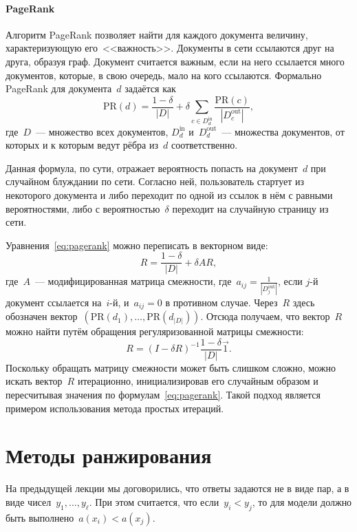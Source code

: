 \documentclass[12pt,fleqn]{article}
\begin{document}
\paragraph{PageRank}
Алгоритм PageRank позволяет найти для каждого документа величину,
характеризующую его~<<важность>>.
Документы в сети ссылаются друг на друга, образуя граф.
Документ считается важным, если на него ссылается много документов,
которые, в свою очередь, мало на кого ссылаются.
Формально PageRank для документа~$d$ задаётся как
\begin{equation}
\label{eq:pagerank}
    \text{PR}(d)
    =
    \frac{1 - \delta}{|D|}
    +
    \delta
    \sum_{c \in D_d^\text{in}}
        \frac{
            \text{PR}(c)
        }{
            |D_c^\text{out}|
        },
\end{equation}
где~$D$~--- множество всех документов,
$D_d^\text{in}$ и~$D_d^\text{out}$~--- множества документов, от которых и к которым ведут рёбра из~$d$ соответственно.

Данная формула, по сути, отражает вероятность попасть на документ~$d$ при случайном блуждании по сети.
Согласно ней, пользователь стартует из некоторого документа и либо переходит по одной из ссылок в нём с равными вероятностями,
либо с вероятностью~$\delta$ переходит на случайную страницу из сети.

Уравнения~\eqref{eq:pagerank} можно переписать в векторном виде:
\[
    R
    =
    \frac{1 - \delta}{|D|}
    +
    \delta A R,
\]
где~$A$~--- модифицированная матрица смежности, где~$a_{ij} = \frac{1}{|D_j^\text{out}|}$,
если $j$-й документ ссылается на~$i$-й, и~$a_{ij} = 0$ в противном случае.
Через~$R$ здесь обозначен вектор~$(\text{PR}(d_1), \dots, \text{PR}(d_|D|))$.
Отсюда получаем, что вектор~$R$ можно найти путём обращения регуляризованной матрицы смежности:
\[
    R
    =
    (I - \delta R)^{-1}
    \frac{1 - \delta}{|D|}
    \vec 1.
\]
Поскольку обращать матрицу смежности может быть слишком сложно,
можно искать вектор~$R$ итерационно, инициализировав его случайным образом
и пересчитывая значения по формулам~\eqref{eq:pagerank}.
Такой подход является примером использования метода простых итераций.

\section{Методы ранжирования}
На предыдущей лекции мы договорились, что ответы задаются не в виде пар,
а в виде чисел~$y_1, \dots, y_\ell$.
При этом считается, что если~$y_i < y_j$, то для модели должно быть выполнено~$a(x_i) < a(x_j)$.
\end{document}
